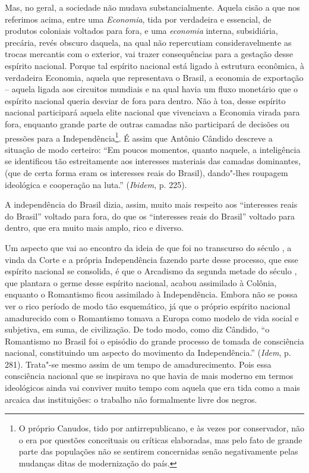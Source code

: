 Mas, no geral, a sociedade não mudava substancialmente. Aquela cisão a
que nos referimos acima, entre uma \emph{Economia}, tida por verdadeira
e essencial, de produtos coloniais voltados para fora, e uma
\emph{economia} interna, subsidiária, precária, revés obscuro daquela,
na qual não repercutiam consideravelmente as trocas mercantis com o
exterior, vai trazer consequências para a gestação desse espírito
nacional. Porque tal espírito nacional está ligado à estrutura
econômica, à verdadeira Economia, aquela que representava o Brasil, a
economia de exportação -- aquela ligada aos circuitos mundiais e na qual
havia um fluxo monetário que o espírito nacional queria desviar de fora
para dentro. Não à toa, desse espírito nacional participará aquela elite
nacional que vivenciava a Economia virada para fora, enquanto grande
parte de outras camadas não participará de decisões ou pressões para a
Independência\footnote{O próprio Canudos, tido por antirrepublicano, e
  às vezes por conservador, não o era por questões conceituais ou críticas elaboradas,
  mas pelo fato de grande parte das populações não se sentirem concernidas senão
  negativamente pelas mudanças ditas de modernização do país.}. É assim
que Antônio Cândido descreve a situação de modo certeiro: ``Em poucos
momentos, quanto naquele, a inteligência se identificou tão
estreitamente aos interesses materiais das camadas dominantes, (que de
certa forma eram os interesses reais do Brasil), dando"-lhes roupagem
ideológica e cooperação na luta.'' (\emph{Ibidem}, p. 225).

A independência do Brasil dizia, assim, muito mais respeito aos
``interesses reais do Brasil'' voltado para fora, do que os ``interesses
reais do Brasil'' voltado para dentro, que era muito mais amplo, rico e
diverso.

Um aspecto que vai ao encontro da ideia de que foi no transcurso do
século , a vinda da Corte e a própria Independência fazendo parte
desse processo, que esse espírito nacional se consolida, é que o
Arcadismo da segunda metade do século , que plantara o germe desse
espírito nacional, acabou assimilado à Colônia, enquanto o Romantismo
ficou assimilado à Independência. Embora não se possa ver o rico período
de modo tão esquemático, já que o próprio espírito nacional amadurecido
com o Romantismo tomava a Europa como modelo de vida social e subjetiva,
em suma, de civilização. De todo modo, como diz Cândido, ``o Romantismo
no Brasil foi o episódio do grande processo de tomada de consciência
nacional, constituindo um aspecto do movimento da Independência.''
(\emph{Idem}, p. 281). Trata"-se mesmo assim de um tempo de
amadurecimento. Pois essa consciência nacional que se inspirava no que
havia de mais moderno em termos ideológicos ainda vai conviver muito
tempo com aquela que era tida como a mais arcaica das instituições: o
trabalho não formalmente livre dos negros.

